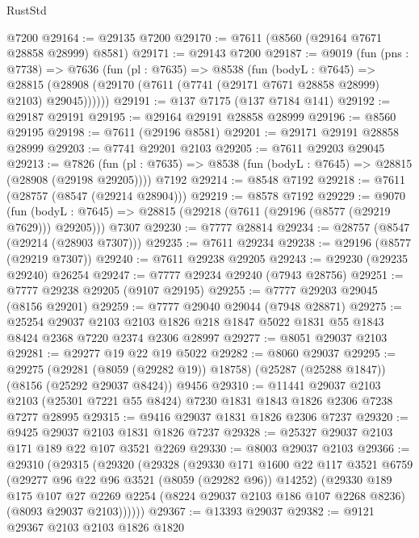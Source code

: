 \begin{lexlean}{RustStd}
\begin{coremodule}
{\begin{coremodule}
{{{{{{{{{{{{{{{{{{{{{{{{{{{{{{{{{{    @7200
@29164 := @29135 @7200
@29170 := @7611 (@8560 (@29164 @7671 @28858 @28999) @8581)
@29171 := @29143 @7200
@29187 := @9019
    (fun (pns : @7738) =>
    @7636
      (fun (pl : @7635) =>
      @8538
        (fun (bodyL : @7645) =>
        @28815 (@28908 (@29170 (@7611 (@7741 (@29171 @7671 @28858 @28999) @2103) @29045))))))
@29191 := @137 @7175 (@137 @7184 @141)
@29192 := @29187 @29191
@29195 := @29164 @29191 @28858 @28999
@29196 := @8560 @29195
@29198 := @7611 (@29196 @8581)
@29201 := @29171 @29191 @28858 @28999
@29203 := @7741 @29201 @2103
@29205 := @7611 @29203 @29045
@29213 := @7826
    (fun (pl : @7635) => @8538 (fun (bodyL : @7645) => @28815 (@28908 (@29198 @29205))))
    @7192
@29214 := @8548 @7192
@29218 := @7611 (@28757 (@8547 (@29214 @28904)))
@29219 := @8578 @7192
@29229 := @9070
    (fun (bodyL : @7645) => @28815 (@29218 (@7611 (@29196 (@8577 (@29219 @7629))) @29205)))
    @7307
@29230 := @7777 @28814
@29234 := @28757 (@8547 (@29214 (@28903 @7307)))
@29235 := @7611 @29234
@29238 := @29196 (@8577 (@29219 @7307))
@29240 := @7611 @29238 @29205
@29243 := @29230 (@29235 @29240) @26254
@29247 := @7777 @29234 @29240 (@7943 @28756)
@29251 := @7777 @29238 @29205 (@9107 @29195)
@29255 := @7777 @29203 @29045 (@8156 @29201)
@29259 := @7777 @29040 @29044 (@7948 @28871)
@29275 := @25254
    @29037
    @2103
    @2103
    @1826
    @218
    @1847
    @5022
    @1831
    @55
    @1843
    @8424
    @2368
    @7220
    @2374
    @2306
    @28997
@29277 := @8051 @29037 @2103
@29281 := @29277 @19 @22 @19 @5022
@29282 := @8060 @29037
@29295 := @29275
    (@29281 (@8059 (@29282 @19)) @18758)
    (@25287 (@25288 @1847))
    (@8156 (@25292 @29037 @8424))
    @9456
@29310 := @11441
    @29037
    @2103
    @2103
    (@25301 @7221 @55 @8424)
    @7230
    @1831
    @1843
    @1826
    @2306
    @7238
    @7277
    @28995
@29315 := @9416 @29037 @1831 @1826 @2306 @7237
@29320 := @9425 @29037 @2103 @1831 @1826 @7237
@29328 := @25327 @29037 @2103 @171 @189 @22 @107 @3521 @2269
@29330 := @8003 @29037 @2103
@29366 := @29310
    (@29315
      (@29320
        (@29328
          (@29330
            @171
            @1600
            @22
            @117
            @3521
            @6759
            (@29277 @96 @22 @96 @3521 (@8059 (@29282 @96)) @14252)
            (@29330
              @189
              @175
              @107
              @27
              @2269
              @2254
              (@8224 @29037 @2103 @186 @107 @2268 @8236)
              (@8093 @29037 @2103))))))
@29367 := @13393 @29037
@29382 := @9121
    @29367
    @2103
    @2103
    @1826
    @1820
}}}}}}}}}}}}}}}}}}}}}}}}}}}}}}}}}}
\end{coremodule}}
\end{coremodule}
\end{lexlean}
